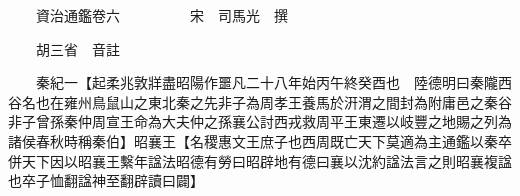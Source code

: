 










 


 
 


 

  
  
  
  
  





  
  
  
  
  
 
  

  

  
  
  



  

 
 

  
   




  

  
  


  　　資治通鑑卷六　　　　　宋　司馬光　撰

　　胡三省　音註

　　秦紀一【起柔兆敦牂盡昭陽作噩凡二十八年始丙午終癸酉也　陸德明曰秦隴西谷名也在雍州鳥鼠山之東北秦之先非子為周孝王養馬於汧渭之間封為附庸邑之秦谷非子曾孫秦仲周宣王命為大夫仲之孫襄公討西戎救周平王東遷以岐豐之地賜之列為諸侯春秋時稱秦伯】昭襄王【名稷惠文王庶子也西周既亡天下莫適為主通鑑以秦卒併天下因以昭襄王繫年諡法昭德有勞曰昭辟地有德曰襄以沈約諡法言之則昭襄複諡也卒子恤翻諡神至翻辟讀曰闢】

